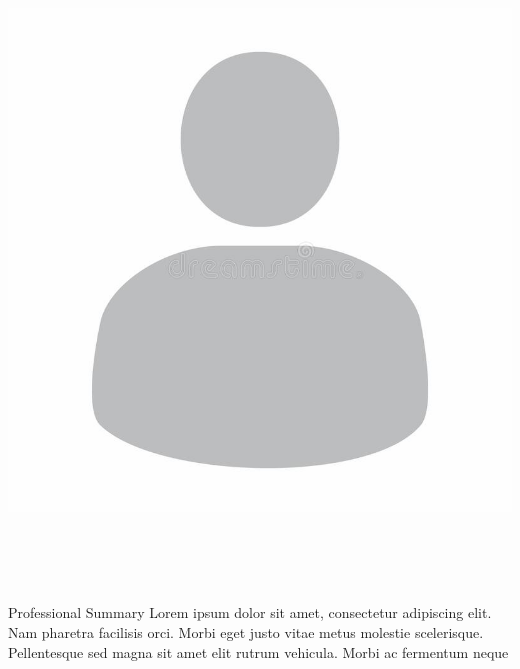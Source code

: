 \documentclass{resume} %
\begin{document}
    \begin{paracol}{2} %
        \begin{center}
            \includegraphics[width=1\linewidth]{pic2.jpg}
        \end{center}
    \switchcolumn %
        \null\vspace{1em}

        \begin{center}
            \printname \\
             \\
             \\
            \infoSeparator
            \infoSeparator
        \end{center}

    \end{paracol}
    
\begin{rSection}{Professional Summary}
Lorem ipsum dolor sit amet, consectetur adipiscing elit. Nam pharetra facilisis orci. Morbi eget justo vitae metus molestie scelerisque. Pellentesque sed magna sit amet elit rutrum vehicula. Morbi ac fermentum neque
\end{rSection}
\end{document}
